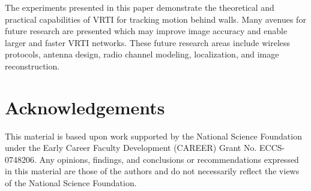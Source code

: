 \documentclass[journal]{IEEEtran}
\begin{document}
The experiments presented in this paper demonstrate the theoretical and practical capabilities of VRTI for tracking motion behind walls. Many avenues for future research are presented which may improve image accuracy and enable larger and faster VRTI networks. These future research areas include wireless protocols, antenna design, radio channel modeling, localization, and image reconstruction.

\section*{Acknowledgements}
This material is based upon work supported by the National Science Foundation under the Early Career Faculty Development (CAREER) Grant No. ECCS-0748206. Any opinions, findings, and conclusions or recommendations expressed in this material are those of the authors and do not necessarily reflect the views of the National Science Foundation.




\end{document}
